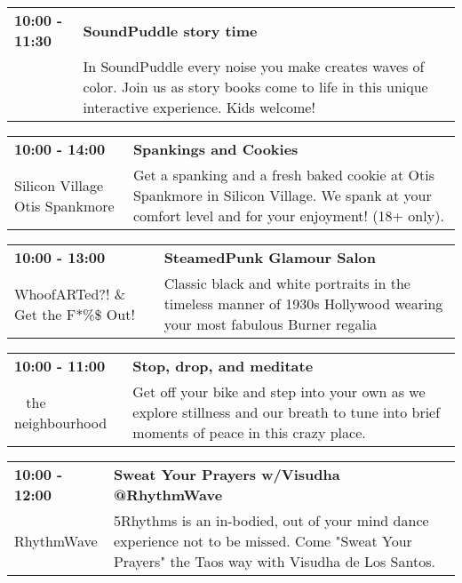 \begin{tabular}{ p{1in} p{2.2in} }
    \textbf{10:00 - 11:30} & \textbf{SoundPuddle story time} \\
    ~ \newline  & In SoundPuddle every noise you make creates waves of color. Join us as story books come to life in this unique interactive experience. Kids welcome! \\
    \hline 
\end{tabular}
    
\begin{tabular}{ p{1in} p{2.2in} }
    \textbf{10:00 - 14:00} & \textbf{Spankings and Cookies} \\
    Silicon Village \newline Otis Spankmore & Get a spanking and a fresh baked cookie at Otis Spankmore in Silicon Village. We spank at your comfort level and for your enjoyment! (18+ only). \\
    \hline 
\end{tabular}
    
\begin{tabular}{ p{1in} p{2.2in} }
    \textbf{10:00 - 13:00} & \textbf{SteamedPunk Glamour Salon} \\
    WhoofARTed?! \& Get the F*\%\$ Out! \newline  & Classic black and white portraits in the timeless manner of 1930s Hollywood wearing your most fabulous Burner regalia \\
    \hline 
\end{tabular}
    
\begin{tabular}{ p{1in} p{2.2in} }
    \textbf{10:00 - 11:00} & \textbf{Stop, drop, and meditate} \\
    ~ \newline the neighbourhood & Get off your bike and step into your own as we explore stillness and our breath to tune into brief moments of peace in this crazy place. \\
    \hline 
\end{tabular}
    
\begin{tabular}{ p{1in} p{2.2in} }
    \textbf{10:00 - 12:00} & \textbf{Sweat Your Prayers w/Visudha @RhythmWave} \\
    RhythmWave \newline  & 5Rhythms is an in-bodied, out of your mind dance experience not to be missed. Come "Sweat Your Prayers" the Taos way with Visudha de Los Santos. \\
    \hline 
\end{tabular}
    
